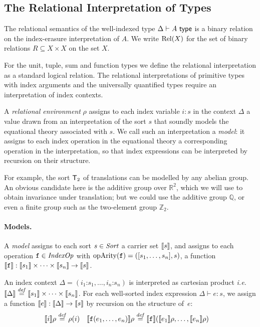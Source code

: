 \subsection{The Relational Interpretation of Types}
\label{sec:relational-semantics}

The relational semantics of the well-indexed type
$\Delta \vdash A \textup{\textsf{ type}}$ is a binary relation on the index-erasure
interpretation of $A$. We write $\mathrm{Rel}(X)$ for the set
of binary relations $R \subseteq X \times X$ on the set $X$.

For the unit, tuple, sum and function types we define the
relational interpretation as a standard logical relation. The
relational interpretations of primitive types with index arguments and
the universally quantified types require an interpretation of index
contexts.

A \emph{relational environment} $\rho$ assigns to each index variable $i:s$
in the context $\Delta$ a value drawn from an interpretation of
the sort $s$ that soundly models the equational theory associated with $s$. We call
such an interpretation a \emph{model}: it assigns to each index operation in the equational 
theory a corresponding operation in the interpretation, so that index expressions 
can be interpreted by recursion on their structure. 

For example, the sort $\mathsf{T}_2$ of translations can be modelled by
any abelian group. An obvious candidate here is the additive group over 
$\mathbb R^2$, which we will use to obtain invariance under translation;
but we could use the additive group $\mathbb Q$, or even a finite group such as the 
two-element group $\mathbb Z_2$. 

\paragraph{Models.}
A \emph{model} 
assigns to each sort $s \in \mathit{Sort}$ a
carrier set $\llbracket s \rrbracket$, and assigns to each operation $\texttt{f}
\in \mathit{IndexOp}$ with $\mathrm{opArity}(\texttt{f}) =
([s_1,\ldots,s_n],s)$, a function $\llbracket \texttt{f} \rrbracket :
\llbracket s_1 \rrbracket\times\cdots\times\llbracket s_n \rrbracket \to \llbracket s \rrbracket$.

An index context $\Delta = (i_1\mathord:s_1,\ldots,i_n\mathord:s_n)$ is
interpreted as cartesian product \emph{i.e.} $\llbracket \Delta \rrbracket \stackrel{\mathit{def}}= \llbracket s_1 \rrbracket
\times\cdots \times \llbracket s_n \rrbracket$. 
For each well-sorted index expression $\Delta \vdash
e : s$, we assign a function $\llbracket e \rrbracket : \llbracket \Delta \rrbracket \to
\llbracket s \rrbracket$ by recursion on the structure of~$e$:
\begin{align*}
\llbracket i \rrbracket \rho & \stackrel{\mathit{def}}= \rho(i) &
\llbracket \textup{\texttt{f}}(e_1, \ldots, e_n) \rrbracket \rho & \stackrel{\mathit{def}}= \llbracket \textup{\texttt{f}} \rrbracket(
\llbracket e_1 \rrbracket\rho,\ldots,\llbracket e_n \rrbracket\rho)
\end{align*}


